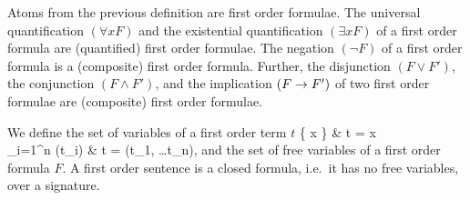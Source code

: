 
\begin{definition}[\FOF]\label{def:syntax:FOF}
	Atoms from the previous definition are {\myem first order formulae}.  
	The universal quantification $(\forall x F)$ 
	and the existential quantification $(\exists x F)$ 
	of a first order formula are (quantified) first order formulae.
	The negation $(\lnot F)$ of a first order formula
	is a (composite) first order formula.
	Further, the disjunction $(F \lor F')$, 
	the conjunction $(F \land F') $, 
	and the implication $(F \rightarrow F')$ 
	of two first order formulae
	are (composite) first order formulae.
\end{definition}

\begin{definition}\label{def:term:vars}\label{def:fof:fvars}\label{def:fof:sentence}
	We define the set of variables of a first order term $t$
	 {
		\{ x \} &  t = x \in \mcV \\
		\bigcup_{i=1}^n \var(t_i) &   t = \mf(t_1, \ldots t_n), \mf \in \mcFfn
	}
and the set of {\myem free} variables of a first order formula $F$.
A first order {\myem sentence} is a closed formula, 
i.e.~it has no free variables, 
over a signature.
\end{definition}